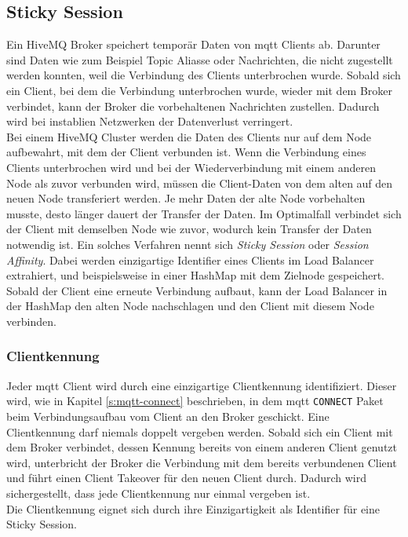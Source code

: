 \subsection{Sticky Session} \label{ss:sticky-session}
Ein HiveMQ Broker speichert temporär Daten von \ac{mqtt} Clients ab. Darunter sind Daten wie zum Beispiel Topic Aliasse oder Nachrichten, die nicht zugestellt werden konnten, weil die Verbindung des Clients unterbrochen wurde. Sobald sich ein Client, bei dem die Verbindung unterbrochen wurde, wieder mit dem Broker verbindet, kann der Broker die vorbehaltenen Nachrichten zustellen. Dadurch wird bei instablien Netzwerken der Datenverlust verringert.
\\
Bei einem HiveMQ Cluster werden die Daten des Clients nur auf dem Node aufbewahrt, mit dem der Client verbunden ist. Wenn die Verbindung eines Clients unterbrochen wird und bei der Wiederverbindung mit einem anderen Node als zuvor verbunden wird, müssen die Client-Daten von dem alten auf den neuen Node transferiert werden. Je mehr Daten der alte Node vorbehalten musste, desto länger dauert der Transfer der Daten.
Im Optimalfall verbindet sich der Client mit demselben Node wie zuvor, wodurch kein Transfer der Daten notwendig ist.
Ein solches Verfahren nennt sich \textit{Sticky Session} oder \textit{Session Affinity}. Dabei werden einzigartige Identifier eines Clients im Load Balancer extrahiert, und beispielsweise in einer HashMap mit dem Zielnode gespeichert. Sobald der Client eine erneute Verbindung aufbaut, kann der Load Balancer in der HashMap den alten Node nachschlagen und den Client mit diesem Node verbinden. \cite{WhatDoesTerm}

\subsubsection{Clientkennung} \label{ss:clientid}
Jeder \ac{mqtt} Client wird durch eine einzigartige Clientkennung identifiziert. Dieser wird, wie in Kapitel \ref{s:mqtt-connect} beschrieben, in dem \ac{mqtt} \verb|CONNECT| Paket beim Verbindungsaufbau vom Client an den Broker geschickt.
Eine Clientkennung darf niemals doppelt vergeben werden. Sobald sich ein Client mit dem Broker verbindet, dessen Kennung bereits von einem anderen Client genutzt wird, unterbricht der Broker die Verbindung mit dem bereits verbundenen Client und führt einen Client Takeover für den neuen Client durch. Dadurch wird sichergestellt, dass jede Clientkennung nur einmal vergeben ist.
\\
Die Clientkennung eignet sich durch ihre Einzigartigkeit als Identifier für eine Sticky Session.

